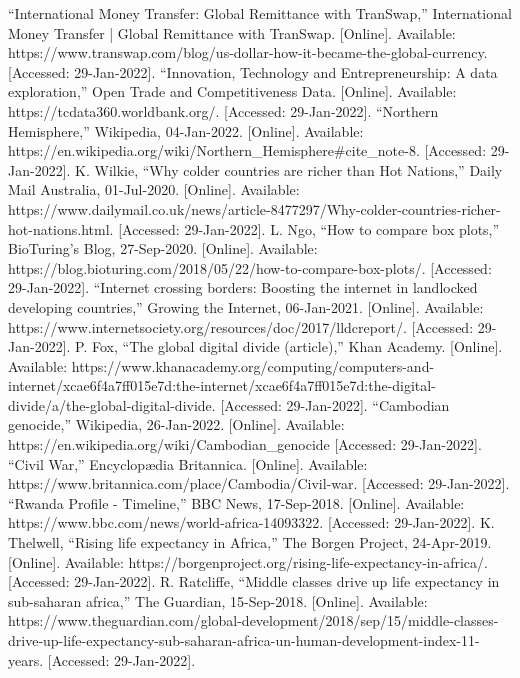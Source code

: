 \documentclass[15pt]{article}
\begin{document}
\newpage

\begin{flushleft}

\begin{thebibliography}{9}
 “International Money Transfer: Global Remittance with TranSwap,” International Money Transfer | Global Remittance with TranSwap. [Online]. Available: https://www.transwap.com/blog/us-dollar-how-it-became-the-global-currency. [Accessed: 29-Jan-2022]. 
 “Innovation, Technology and Entrepreneurship: A data exploration,” Open Trade and Competitiveness Data. [Online]. Available: https://tcdata360.worldbank.org/. [Accessed: 29-Jan-2022]. 
 “Northern Hemisphere,” Wikipedia, 04-Jan-2022. [Online]. Available: https://en.wikipedia.org/wiki/Northern\_Hemisphere\#cite\_note-8. [Accessed: 29-Jan-2022]. 
 K. Wilkie, “Why colder countries are richer than Hot Nations,” Daily Mail Australia, 01-Jul-2020. [Online]. Available: https://www.dailymail.co.uk/news/article-8477297/Why-colder-countries-richer-hot-nations.html. [Accessed: 29-Jan-2022]. 
 L. Ngo, “How to compare box plots,” BioTuring's Blog, 27-Sep-2020. [Online]. Available: https://blog.bioturing.com/2018/05/22/how-to-compare-box-plots/. [Accessed: 29-Jan-2022]. 
 “Internet crossing borders: Boosting the internet in landlocked developing countries,” Growing the Internet, 06-Jan-2021. [Online]. Available: https://www.internetsociety.org/resources/doc/2017/lldcreport/. [Accessed: 29-Jan-2022]. 
 P. Fox, “The global digital divide (article),” Khan Academy. [Online]. Available: https://www.khanacademy.org/computing/computers-and-internet/xcae6f4a7ff015e7d:the-internet/xcae6f4a7ff015e7d:the-digital-divide/a/the-global-digital-divide. [Accessed: 29-Jan-2022]. 
 “Cambodian genocide,” Wikipedia, 26-Jan-2022. [Online]. Available: https://en.wikipedia.org/wiki/Cambodian\_genocide [Accessed: 29-Jan-2022]. 
 “Civil War,” Encyclopædia Britannica. [Online]. Available: https://www.britannica.com/place/Cambodia/Civil-war. [Accessed: 29-Jan-2022]. 
 “Rwanda Profile - Timeline,” BBC News, 17-Sep-2018. [Online]. Available: https://www.bbc.com/news/world-africa-14093322. [Accessed: 29-Jan-2022].
 K. Thelwell, “Rising life expectancy in Africa,” The Borgen Project, 24-Apr-2019. [Online]. Available: https://borgenproject.org/rising-life-expectancy-in-africa/. [Accessed: 29-Jan-2022]. 
 R. Ratcliffe, “Middle classes drive up life expectancy in sub-saharan africa,” The Guardian, 15-Sep-2018. [Online]. Available: https://www.theguardian.com/global-development/2018/sep/15/middle-classes-drive-up-life-expectancy-sub-saharan-africa-un-human-development-index-11-years. [Accessed: 29-Jan-2022]. 

\end{thebibliography}
\end{flushleft}
\end{document}
